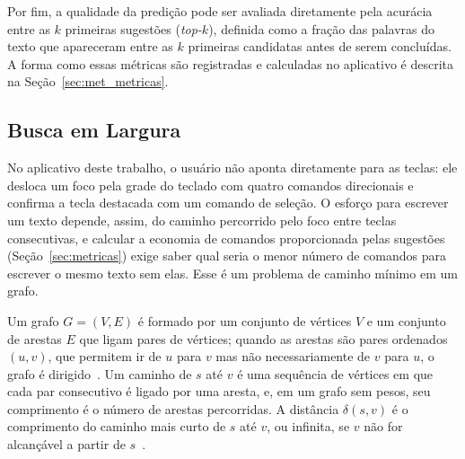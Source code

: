 Por fim, a qualidade da predição pode ser avaliada diretamente pela acurácia entre as $k$ primeiras sugestões (\textit{top-$k$}), definida como a fração das palavras do texto que apareceram entre as $k$ primeiras candidatas antes de serem concluídas. A forma como essas métricas são registradas e calculadas no aplicativo é descrita na Seção~\ref{sec:met_metricas}.

\subsection{Busca em Largura} \label{sec:bfs}

No aplicativo deste trabalho, o usuário não aponta diretamente para as teclas: ele desloca um foco pela grade do teclado com quatro comandos direcionais e confirma a tecla destacada com um comando de seleção. O esforço para escrever um texto depende, assim, do caminho percorrido pelo foco entre teclas consecutivas, e calcular a economia de comandos proporcionada pelas sugestões (Seção~\ref{sec:metricas}) exige saber qual seria o menor número de comandos para escrever o mesmo texto sem elas. Esse é um problema de caminho mínimo em um grafo.

Um grafo $G = (V, E)$ é formado por um conjunto de vértices $V$ e um conjunto de arestas $E$ que ligam pares de vértices; quando as arestas são pares ordenados $(u, v)$, que permitem ir de $u$ para $v$ mas não necessariamente de $v$ para $u$, o grafo é dirigido~\cite[seç.~5.2]{erickson2019algorithms}. Um caminho de $s$ até $v$ é uma sequência de vértices em que cada par consecutivo é ligado por uma aresta, e, em um grafo sem pesos, seu comprimento é o número de arestas percorridas. A distância $\delta(s, v)$ é o comprimento do caminho mais curto de $s$ até $v$, ou infinita, se $v$ não for alcançável a partir de $s$~\cite[seç.~8.3]{erickson2019algorithms}.


